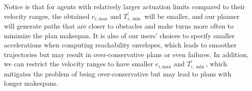 \documentclass[letterpaper]{article} %
\theoremstyle{definition}
\begin{document}
Notice is that for agents with relatively larger actuation limits compared to their velocity ranges, the obtained $e_{i,\text{max}}$ and $T_{i,\min}^\prime$ will be smaller, and our planner will generate paths that are closer to obstacles and make turns more often to minimize the plan makespan. It is also of our users' choices to specify smaller accelerations when computing reachability envelopes, which leads to smoother trajectories but may result in over-conservative plans or even failures. In addition, we can restrict the velocity ranges to have smaller $e_{i,\text{max}}$ and $T_{i,\min}^\prime$, which mitigates the problem of being over-conservative but may lead to plans with longer makespans.





\end{document}
